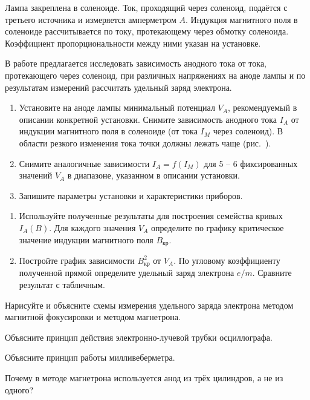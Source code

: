 Лампа закреплена в соленоиде. Ток, проходящий через соленоид, подаётся с третьего источника и измеряется амперметром $A$. Индукция магнитного поля в соленоиде рассчитывается по току, протекающему через обмотку соленоида. Коэффициент пропорциональности между ними указан на установке.

\begin{lab:task}

В работе предлагается исследовать зависимость анодного тока от тока, протекающего через соленоид, при различных
напряжениях на аноде лампы и по результатам измерений рассчитать удельный заряд электрона.

\begin{enumerate}
\item{ Установите на аноде лампы минимальный потенциал $V_A$, рекомендуемый в описании конкретной установки. Снимите зависимость анодного тока $I_A$ от индукции магнитного поля в соленоиде (от тока $I_{M}$ через соленоид). В области резкого изменения тока точки должны лежать чаще (рис.~)}.
\item{ Снимите аналогичные зависимости $I_A=f(I_M)$ для 5 -- 6 фиксированных значений $V_A$ в диапазоне, указанном в описании установки.}

\item{ Запишите параметры установки и характеристики приборов.}
\end{enumerate}

\begin{enumerate}
\item{Используйте полученные результаты для построения семейства кривых $I_{A}(B)$. Для каждого значения $V_A$ определите по графику критическое значение индукции магнитного поля $B_\text{кр}$}.
\item Постройте  график зависимости $B_\text{кр}^2$ от $V_A$. По угловому коэффициенту полученной прямой определите удельный заряд электрона $e/m$. Сравните результат с табличным.
\end{enumerate}
\end{lab:task}

\begin{lab:questions}
\item{ Нарисуйте и объясните схемы измерения удельного заряда электрона методом магнитной фокусировки и методом магнетрона.}
\item{Объясните принцип действия электронно-лучевой трубки осциллографа.}
\item{ Объясните принцип работы милливеберметра.}
\item{ Почему в методе магнетрона используется анод из трёх цилиндров, а не из одного?}
\end{lab:questions}

